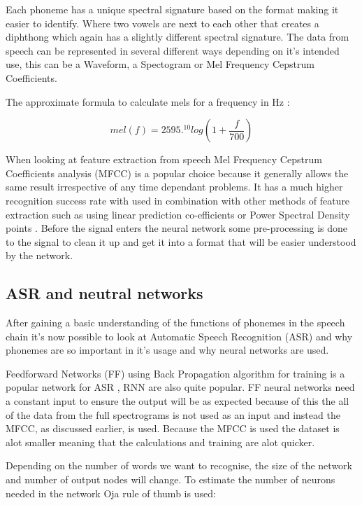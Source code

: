 \documentclass[11pt]{article}
\begin{document}
    Each phoneme has a unique spectral signature based on the format making it easier to identify. Where two vowels are next to each other that creates a diphthong which again has a slightly different spectral signature. The data from speech can be represented in several different ways depending on it's intended use, this can be a Waveform, a Spectogram or Mel Frequency Cepstrum Coefficients. 
    
    The approximate formula to calculate mels for a frequency in Hz \cite{Gevaert2010NeuralRecognition}:
    
    \begin{equation}
    mel(f)=2595.^{10} log(1+ \frac{f}{700})
    \end{equation}

   When looking at feature extraction from speech Mel Frequency Cepstrum Coefficients analysis (MFCC) is a popular choice because it generally allows the same result irrespective of any time dependant problems. It has a much higher recognition success rate with used in combination with other methods of feature extraction such as using linear prediction co-efficients or Power Spectral Density points \cite{Moonasar2001ASystems}. Before the signal enters the neural network some pre-processing is done to the signal to clean it up and get it into a format that will be easier understood by the network.

    \subsection{ASR and neutral networks}
    After gaining a basic understanding of the functions of phonemes in the speech chain it's now possible to look at Automatic Speech Recognition (ASR) and why phonemes are so important in it's usage and why neural networks are used.
    
    Feedforward Networks (FF) using Back Propagation algorithm for training is a popular network for ASR \cite{K.R2016AutomaticSurvey}, RNN are also quite popular. FF neural networks need a constant input to ensure the output will be as expected because of this the all of the data from the full spectrograms is not used as an input and instead the MFCC, as discussed earlier, is used. Because the MFCC is used the dataset is alot smaller meaning that the calculations and training are alot quicker. 
    
    Depending on the number of words we want to recognise, the size of the network and number of output nodes will change. To estimate the number of neurons needed in the network Oja rule of thumb \cite{Oja1982SimplifiedAnalyzer} is used:
    
\end{document}
